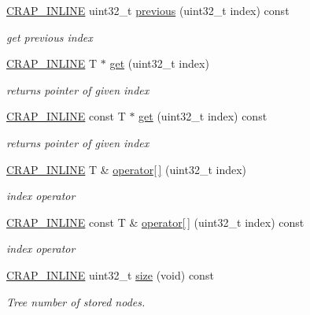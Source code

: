 \begin{DoxyCompactItemize}
\hyperlink{config__x86_8h_a5a40526b8d842e7ff731509998bb0f1c}{C\+R\+A\+P\+\_\+\+I\+N\+L\+I\+N\+E} uint32\+\_\+t \hyperlink{classcrap_1_1tree_a465307512e44daba7b36516e6ea59ffd}{previous} (uint32\+\_\+t index) const 
\begin{DoxyCompactList}\small\item\em get previous index \end{DoxyCompactList}\item 
\hyperlink{config__x86_8h_a5a40526b8d842e7ff731509998bb0f1c}{C\+R\+A\+P\+\_\+\+I\+N\+L\+I\+N\+E} T $\ast$ \hyperlink{classcrap_1_1tree_af82cf9d34ce86a6bdc091e0f1c8e7cdc}{get} (uint32\+\_\+t index)
\begin{DoxyCompactList}\small\item\em returns pointer of given index \end{DoxyCompactList}\item 
\hyperlink{config__x86_8h_a5a40526b8d842e7ff731509998bb0f1c}{C\+R\+A\+P\+\_\+\+I\+N\+L\+I\+N\+E} const T $\ast$ \hyperlink{classcrap_1_1tree_aeb4f71991ee540cfe0bdb26e2f2d6a48}{get} (uint32\+\_\+t index) const 
\begin{DoxyCompactList}\small\item\em returns pointer of given index \end{DoxyCompactList}\item 
\hyperlink{config__x86_8h_a5a40526b8d842e7ff731509998bb0f1c}{C\+R\+A\+P\+\_\+\+I\+N\+L\+I\+N\+E} T \& \hyperlink{classcrap_1_1tree_a7a9fe0ff4d09686681d108ad1809f928}{operator\mbox{[}$\,$\mbox{]}} (uint32\+\_\+t index)
\begin{DoxyCompactList}\small\item\em index operator \end{DoxyCompactList}\item 
\hyperlink{config__x86_8h_a5a40526b8d842e7ff731509998bb0f1c}{C\+R\+A\+P\+\_\+\+I\+N\+L\+I\+N\+E} const T \& \hyperlink{classcrap_1_1tree_ad1df504f38a87fc16b9d74ed871f699e}{operator\mbox{[}$\,$\mbox{]}} (uint32\+\_\+t index) const 
\begin{DoxyCompactList}\small\item\em index operator \end{DoxyCompactList}\item 
\hyperlink{config__x86_8h_a5a40526b8d842e7ff731509998bb0f1c}{C\+R\+A\+P\+\_\+\+I\+N\+L\+I\+N\+E} uint32\+\_\+t \hyperlink{classcrap_1_1tree_aeb959132fdf029c341d17b4caf21ba43}{size} (void) const 
\begin{DoxyCompactList}\small\item\em Tree number of stored nodes. \end{DoxyCompactList}\item 

\end{DoxyCompactItemize}
